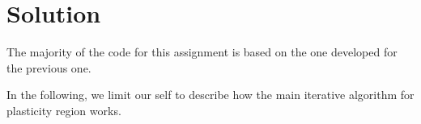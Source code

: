\section{Solution}
\label{sec:solution}

The majority of the code for this assignment is based on the one developed for the previous one.

In the following, we limit our self to describe how the main iterative algorithm for plasticity region works.



